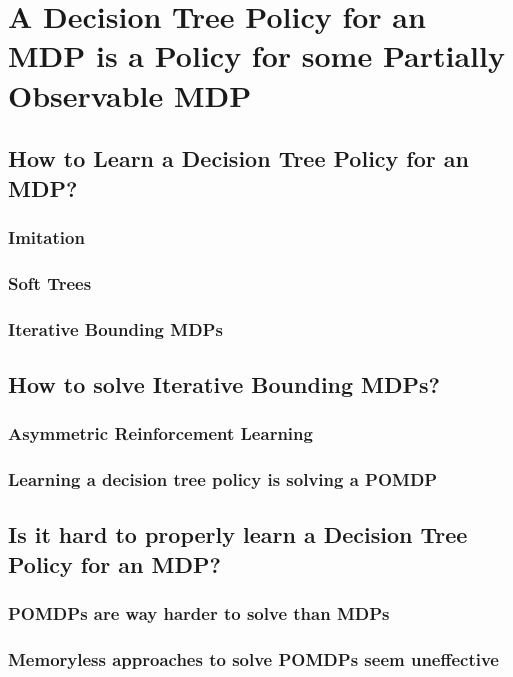 \chapter{A Decision Tree Policy for an MDP is a Policy for some Partially Observable MDP}


\section{How to Learn a Decision Tree Policy for an MDP?}
\subsection{Imitation}
\subsection{Soft Trees}
\subsection{Iterative Bounding MDPs}

\section{How to solve Iterative Bounding MDPs?}
\subsection{Asymmetric Reinforcement Learning}
\subsection{Learning a decision tree policy is solving a POMDP}

\section{Is it hard to properly learn a Decision Tree Policy for an MDP?}
\subsection{POMDPs are way harder to solve than MDPs}
\subsection{Memoryless approaches to solve POMDPs seem uneffective}


